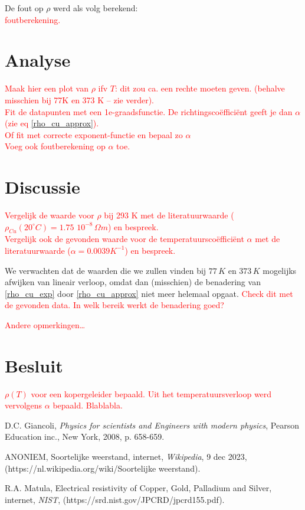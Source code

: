 \documentclass[12pt]{article}
\begin{document}
	De fout op $\rho$ werd als volg berekend:	
	\textcolor{red}{\\foutberekening.}	
	
\section{Analyse}	
	
	\textcolor{red}{Maak hier een plot van $\rho$ ifv $T$: dit zou ca. een rechte moeten geven. (behalve misschien bij 77K en 373 K – zie verder). \\	
	Fit de datapunten met een 1e-graadsfunctie. De richtingscoëfficiënt geeft je dan $\alpha$ (zie eq \eqref{rho_cu_approx}).
	\\ Of fit met  correcte exponent-functie en bepaal zo $\alpha$
	\\ Voeg ook foutberekening op $\alpha$ toe.}
	
	
\section{Discussie}

	\textcolor{red}{Vergelijk de waarde voor $\rho$ bij 293 K met de literatuurwaarde ($\rho_{Cu}(20 ^\circ C) = 1.75 \, \, 10^{-8} \,\Omega m$) en bespreek. \\ Vergelijk ook de gevonden waarde voor de temperatuurscoëfficiënt $\alpha$ met de literatuurwaarde ($\alpha = 0.0039 K^{-1}$) en bespreek.}
	
	We verwachten dat de waarden die we zullen vinden bij $77 \, K$ en $373 \, K$ mogelijks afwijken van lineair verloop, omdat dan (misschien) de benadering van \eqref{rho_cu_exp} door \eqref{rho_cu_approx} niet meer helemaal opgaat. \textcolor{red}{Check dit met de gevonden data. In welk bereik werkt de benadering goed?}
	
	\textcolor{red}{Andere opmerkingen…}


\section{Besluit}

	\textcolor{red}{$\rho(T)$ voor een kopergeleider bepaald. Uit het temperatuursverloop werd vervolgens $\alpha$ bepaald. Blablabla. }
	

\begin{thebibliography}{9}
	
	 D.C. Giancoli,  \textit{Physics for scientists and Engineers with modern physics},  Pearson Education inc., New York, 2008, p. 658-659.
	
	 ANONIEM, Soortelijke weerstand, internet, \textit{Wikipedia}, 9 dec 2023, (https://nl.wikipedia.org/wiki/Soortelijke weerstand).
		
	 R.A. Matula, Electrical resistivity of Copper, Gold, Palladium and Silver, internet, \textit{NIST}, (https://srd.nist.gov/JPCRD/jpcrd155.pdf).
	
\end{thebibliography}
\end{document}
